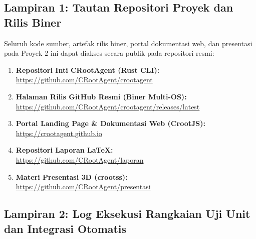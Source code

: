 \subsection*{Lampiran 1: Tautan Repositori Proyek dan Rilis Biner}

Seluruh kode sumber, artefak rilis biner, portal dokumentasi web, dan presentasi pada Proyek 2 ini dapat diakses secara publik pada repositori resmi:
\begin{enumerate}
    \item \textbf{Repositori Inti CRootAgent (Rust CLI):} \\
    \url{https://github.com/CRootAgent/crootagent}
    \item \textbf{Halaman Rilis GitHub Resmi (Biner Multi-OS):} \\
    \url{https://github.com/CRootAgent/crootagent/releases/latest}
    \item \textbf{Portal Landing Page \& Dokumentasi Web (CrootJS):} \\
    \url{https://crootagent.github.io}
    \item \textbf{Repositori Laporan LaTeX:} \\
    \url{https://github.com/CRootAgent/laporan}
    \item \textbf{Materi Presentasi 3D (crootss):} \\
    \url{https://github.com/CRootAgent/presentasi}
\end{enumerate}

\vspace{0.8cm}
\subsection*{Lampiran 2: Log Eksekusi Rangkaian Uji Unit dan Integrasi Otomatis}

